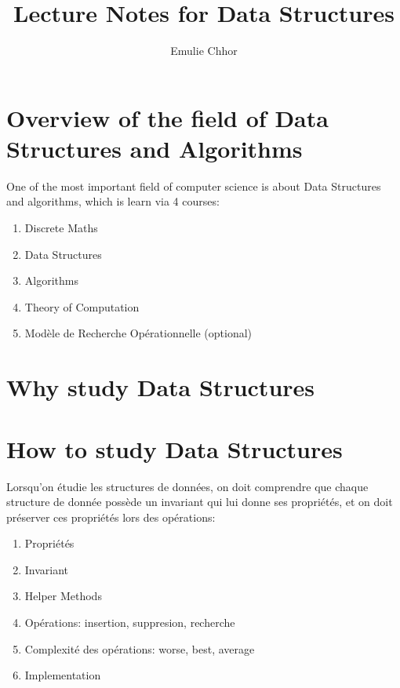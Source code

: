 \documentclass{article}
\begin{document}
\title{Lecture Notes for Data Structures}
\author{Emulie Chhor}
\maketitle

\section{Overview of the field of Data Structures and Algorithms}

One of the most important field of computer science is about Data Structures and
algorithms, which is learn via 4 courses:

\begin{enumerate}
    \item Discrete Maths
    \item Data Structures
    \item Algorithms
    \item Theory of Computation
    \item Modèle de Recherche Opérationnelle (optional)
\end{enumerate}

\newtheorem{definition}{Definition}[subsection]
\newtheorem{theorem}{Theorem}[subsection]
\newtheorem{proposition}{Proposition}[section]
\newtheorem{property}{Propriété}[subsection]
\newtheorem*{remark}{Remarque}
\newtheorem*{problem}{Problème}
\newtheorem*{intuition}{Intuition}

\section{Why study Data Structures}

\section{How to study Data Structures}%
\label{sec:How to study Data Structures}

Lorsqu'on étudie les structures de données, on doit comprendre que
chaque structure de donnée possède un invariant qui lui donne ses propriétés,
et on doit préserver ces propriétés lors des opérations:
\begin{enumerate}
    \item Propriétés
    \item Invariant
    \item Helper Methods
    \item Opérations: insertion, suppresion, recherche
    \item Complexité des opérations: worse, best, average
    \item Implementation
\end{enumerate}
\end{document}
